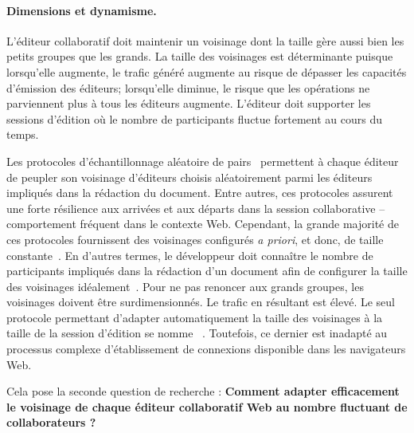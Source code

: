 \paragraph{Dimensions et dynamisme.} L'éditeur collaboratif doit maintenir un
voisinage dont la taille gère aussi bien les petits groupes que les grands.  La
taille des voisinages est déterminante puisque lorsqu'elle augmente, le trafic
généré augmente au risque de dépasser les capacités d'émission des éditeurs;
lorsqu'elle diminue,
le risque que les opérations ne parviennent plus à tous les éditeurs augmente.
L'éditeur doit supporter les sessions d'édition où le nombre de participants
fluctue fortement au cours du temps.

Les protocoles d'échantillonnage aléatoire de pairs~\cite{jelasity2007gossip}
permettent à chaque éditeur de peupler son voisinage d'éditeurs choisis
aléatoirement parmi les éditeurs impliqués dans la rédaction du document. Entre
autres, ces protocoles assurent une forte résilience aux arrivées et aux départs
dans la session collaborative -- comportement fréquent dans le contexte
Web. Cependant, la grande majorité de ces protocoles fournissent des voisinages
configurés \emph{a priori}, et donc, de taille
constante~\cite{eugster2003lightweight, jelasity2007gossip,
  leitao2007dependable, tolgyeski2009adaptive, voulgaris2005cyclon}. En d'autres
termes, le développeur doit connaître le nombre de participants impliqués dans
la rédaction d'un document afin de configurer la taille des voisinages
idéalement~\cite{erdos1959random}.  Pour ne pas renoncer aux grands groupes, les
voisinages doivent être surdimensionnés. Le trafic en résultant est élevé. Le
seul protocole permettant d'adapter automatiquement la taille des voisinages à
la taille de la session d'édition se nomme
\SCAMP~\cite{ganesh2003peer}. Toutefois, ce dernier est inadapté au processus
complexe d'établissement de connexions disponible dans les navigateurs Web.


Cela pose la seconde question de recherche : \textbf{Comment adapter
  efficacement le voisinage de chaque éditeur collaboratif Web au nombre
  fluctuant de collaborateurs ?}


